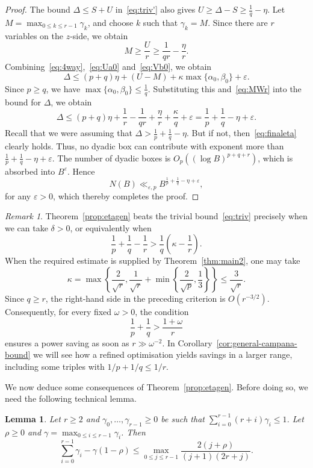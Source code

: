 \documentclass[a4paper,11pt,twoside,reqno]{amsart}
\newtheorem{lemma}[theorem]{Lemma}
\theoremstyle{definition}
\theoremstyle{remark}
\newtheorem{remark}[theorem]{Remark}
\numberwithin{equation}{section}
\newcommand\ve{\varepsilon}
\newcommand\1{\mathbf{1}}
\renewcommand{\leq}{\leqslant}
\renewcommand{\le}{\leqslant}
\renewcommand{\geq}{\geqslant}
\renewcommand{\ge}{\geqslant}
\begin{document}
\begin{proof}
The bound $\Delta\le S+U$ 
in~\eqref{eq:triv'}
also gives
$
U\ge \Delta-S\ge \frac1q-\eta.
$
Let
$M=\max_{0\le k\le r-1}\gamma_k$,
and choose $k$ such that $\gamma_k=M$. Since there are $r$ variables on the $z$-side, we obtain
\begin{equation}\label{eq:MWr}
 M\ge \frac Ur\ge \frac1{qr}-\frac{\eta}{r}.
\end{equation}
Combining~\eqref{eq:4way},~\eqref{eq:Ua0} and~\eqref{eq:Vb0}, we obtain
\[
\Delta
\le
(p+q)\eta+(U-M)
+\kappa\max\{\alpha_0,\beta_0\}+\ve.
\]
Since $p\ge q$, we have 
$
\max\{\alpha_0,\beta_0\}
\le
\frac 1q.
$
Substituting this and~\eqref{eq:MWr} into the bound for $\Delta$, we obtain
\begin{equation}\label{eq:finaleta}
\Delta
\le
(p+q)\eta+
\frac1r-\frac1{qr}+\frac{\eta}{r}+\frac{\kappa}{q}+\ve=
\frac 1p+\frac 1q-\eta+\ve.
\end{equation}
Recall that we were assuming that $\Delta> \frac 1p+\frac 1q-\eta $. But if not, then~\eqref{eq:finaleta} clearly holds.
Thus, no dyadic box can contribute with exponent more than $\frac1p+\frac1q-\eta+\ve$.
The number of dyadic boxes is $O_{p}((\log B)^{p+q+r})$, which is
absorbed into $B^\varepsilon$. Hence
\[
N(B)\ll_{\varepsilon,p}B^{\frac 1p+\frac 1q-\eta+\varepsilon},
\]
for any $\ve>0$, which thereby completes the proof. 
\end{proof}

\begin{remark}
 Theorem~\ref{prop:etagen} beats the trivial bound~\eqref{eq:triv} precisely when we can take $\delta>0$, or
equivalently when
\[
\frac1p+\frac1q-\frac1r
>
\frac1q\left(\kappa-\frac1r\right).
\]
When the required estimate is supplied by Theorem~\ref{thm:main2}, one may take
\[
\kappa
=
\max\left\{
\frac{2}{\sqrt r},
\frac1{\sqrt r}
+\min\left\{\frac2{\sqrt p},\frac13\right\}
\right\}
\leq \frac3{\sqrt r}.
\]
Since $q\geq r$, the right-hand side in the preceding criterion is
$O(r^{-3/2})$. Consequently, for every fixed $\omega>0$, the
condition
\[
\frac1p+\frac1q>\frac{1+\omega}{r}
\]
ensures a power saving as soon as $r\gg\omega^{-2}$. 
In Corollary~\ref{cor:general-campana-bound} we will see how a 
refined optimisation 
yields savings in a larger
range, including some triples with
$1/p+1/q\leq1/r$.
 \end{remark}

We now deduce some consequences of Theorem~\ref{prop:etagen}. Before doing so, we need the following technical lemma.

\begin{lemma}\label{lem:gammarho}
 Let $r\geq2$ and $\gamma_0,\dots,\gamma_{r-1}\geq0$ be such that $\sum_{i=0}^{r-1}(r+i)\gamma_i\leq1$. Let $\rho\geq 0$ and $\gamma=\max_{0\leq i\leq r-1}\gamma_i$. Then
 \[
 \sum_{i=0}^{r-1}\gamma_i -\gamma(1-\rho)\leq \max_{0\leq j\leq r-1}\frac{2(j+\rho)}{(j+1)(2r+j)}.
 \]
\end{lemma}
\end{document}
